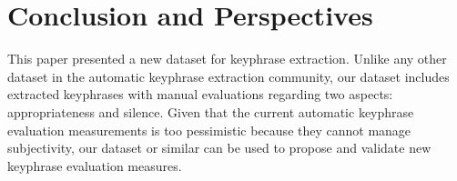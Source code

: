 \section{Conclusion and Perspectives}
\label{sec:conclusion}
    This paper presented a new dataset for keyphrase extraction.
    Unlike any other dataset in the automatic keyphrase extraction community, our dataset includes extracted keyphrases with manual evaluations regarding two aspects: appropriateness and silence.
    Given that the current automatic keyphrase evaluation measurements is too pessimistic because they cannot manage subjectivity, our dataset or similar can be used to propose and validate new keyphrase evaluation measures.
